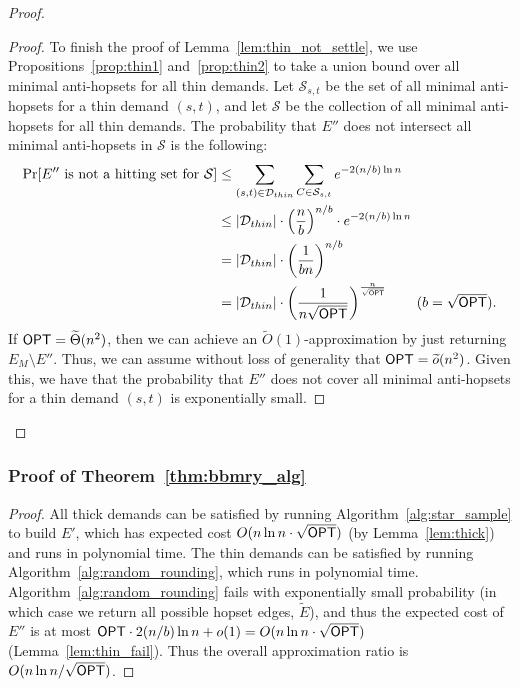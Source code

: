 \documentclass{article}
\theoremstyle{definition}
\theoremstyle{remark}
\def\opt {{\sf OPT}}
\begin{document}
\begin{proof}
\begin{proof}
    To finish the proof of Lemma~\ref{lem:thin_not_settle}, we use Propositions~\ref{prop:thin1} and~\ref{prop:thin2} to take a union bound over all minimal anti-hopsets for all thin demands. Let $\mathcal{S}_{s,t}$ be the set of all minimal anti-hopsets for a thin demand $(s,t)$, and let $\mathcal{S}$ be the collection of all minimal anti-hopsets for all thin demands. The probability that $E''$ does not intersect all minimal anti-hopsets in $\mathcal{S}$ is the following:
    \begin{align*}
        \Pr[E'' \text{ is not a hitting set for } \mathcal{S}] &\leq  \sum_{(s,t) \in \mathcal{D}_{thin}} \sum_{C \in \mathcal{S}_{s,t}} e^{-2 (n/b) \ln{n}} \\
        &\leq  |\mathcal{D}_{thin}| \cdot \left( \frac{n}{b} \right)^{n/b} \cdot e^{-2 (n/b) \ln{n}} \\
        &= |\mathcal{D}_{thin}| \cdot \left( \frac{1}{b n} \right)^{n/b} \\
        &= |\mathcal{D}_{thin}| \cdot \left( \frac{1}{n \sqrt{{\opt}}} \right)^{\frac{n}{\sqrt{{\opt}}}} \tag{$b = \sqrt{{\opt}}$}.
    \end{align*}
    If ${\opt} = \widetilde{\Theta}(n^{2})$, then we can achieve an $\widetilde{O}(1)$-approximation by just returning $E_M \setminus E''$. Thus, we can assume without loss of generality that ${\opt} = \widetilde{o}(n^{2})$.  Given this, we have that the probability that $E''$ does not cover all minimal anti-hopsets for a thin demand $(s,t)$ is exponentially small.
    \end{proof}

\end{proof}
\else
\fi


\subsubsection{Proof of Theorem~\ref{thm:bbmry_alg}}
\begin{proof}
    All thick demands can be satisfied by running Algorithm~\ref{alg:star_sample} to build $E'$, which has expected cost $O(n \ln{n} \cdot \sqrt{{\opt}})$ (by Lemma~\ref{lem:thick}) and runs in polynomial time. The thin demands can be satisfied by running Algorithm~\ref{alg:random_rounding}, which runs in polynomial time. Algorithm~\ref{alg:random_rounding} fails with exponentially small probability (in which case we return all possible hopset edges, $\widetilde{E}$), and thus the expected cost of $E''$ is at most ${\opt} \cdot  2(n/b) \ln{n} + o(1) = O(n \ln{n} \cdot \sqrt{{\opt}} )$ (Lemma~\ref{lem:thin_fail}). Thus the overall approximation ratio is $O( n \ln{n} / \sqrt{{\opt}})$. 
\end{proof}
\end{document}
